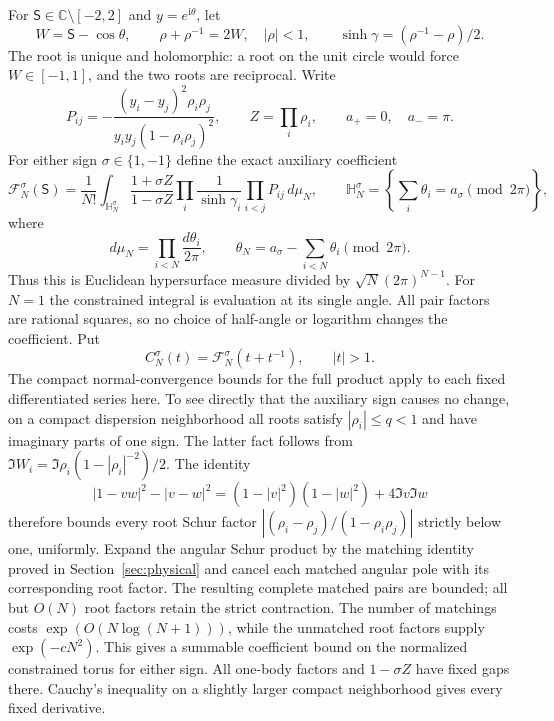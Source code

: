 \documentclass[11pt]{article}
\numberwithin{equation}{section}
\theoremstyle{definition}
\newcommand{\C}{\mathbb C}
\newcommand{\ii}{\mathrm i}
\begin{document}
For $\mathsf S\in\C\setminus[-2,2]$ and $y=e^{\ii\theta}$, let
\[
 W=\mathsf S-\cos\theta,\qquad
 \rho+\rho^{-1}=2W,\quad |\rho|<1,\qquad
 \sinh\gamma=(\rho^{-1}-\rho)/2.
\]
The root is unique and holomorphic: a root on the unit circle would
force $W\in[-1,1]$, and the two roots are reciprocal.  Write
\[
 P_{ij}=-\frac{(y_i-y_j)^2\rho_i\rho_j}
                  {y_i y_j(1-\rho_i\rho_j)^2},\qquad
 Z=\prod_i\rho_i,
 \qquad a_+=0,\quad a_-=\pi.
\]
For either sign $\sigma\in\{1,-1\}$ define the exact auxiliary coefficient
\begin{equation}\label{eq:iso-product}
 \mathcal F_N^\sigma(\mathsf S)
 =\frac1{N!}\int_{\mathbb H_N^\sigma}
       \frac{1+\sigma Z}{1-\sigma Z}
       \prod_i\frac1{\sinh\gamma_i}\prod_{i<j}P_{ij}\,d\mu_N,
 \qquad
 \mathbb H_N^\sigma=\left\{\sum_i\theta_i=a_\sigma
                                    \pmod{2\pi}\right\},
\end{equation}
where
\[
 d\mu_N=\prod_{i<N}\frac{d\theta_i}{2\pi},\qquad
 \theta_N=a_\sigma-\sum_{i<N}\theta_i\pmod{2\pi}.
\]
Thus this is Euclidean hypersurface measure divided by
$\sqrt N(2\pi)^{N-1}$.  For $N=1$ the constrained integral is evaluation
at its single angle.  All pair factors are rational squares, so no
choice of half-angle or logarithm changes the coefficient.  Put
\begin{equation}\label{eq:iso-exterior-coefficients}
 C_N^\sigma(t)=\mathcal F_N^\sigma(t+t^{-1}),\qquad |t|>1.
\end{equation}
The compact normal-convergence bounds for the full product apply to
each fixed differentiated series here.  To see directly that the
auxiliary sign causes no change, on a compact dispersion neighborhood
all roots satisfy $|\rho_i|\le q<1$ and have imaginary parts of one
sign.  The latter fact follows from
$\Im W_i=\Im\rho_i(1-|\rho_i|^{-2})/2$.
The identity
\[
 |1-vw|^2-|v-w|^2
   =(1-|v|^2)(1-|w|^2)+4\Im v\Im w
\]
therefore bounds every root Schur factor
$|(\rho_i-\rho_j)/(1-\rho_i\rho_j)|$ strictly below one, uniformly.
Expand the angular Schur product by the matching identity proved
in Section~\ref{sec:physical} and cancel each matched angular pole
with its corresponding root factor.  The resulting complete matched
pairs are bounded; all but $O(N)$ root factors retain the strict
contraction.  The number of matchings costs
$\exp(O(N\log(N+1)))$, while the unmatched root factors supply
$\exp(-cN^2)$.  This gives a summable coefficient bound on the
normalized constrained torus for either sign.  All one-body factors
and $1-\sigma Z$ have fixed gaps there.  Cauchy's inequality on a
slightly larger compact neighborhood gives every fixed derivative.
\end{document}
